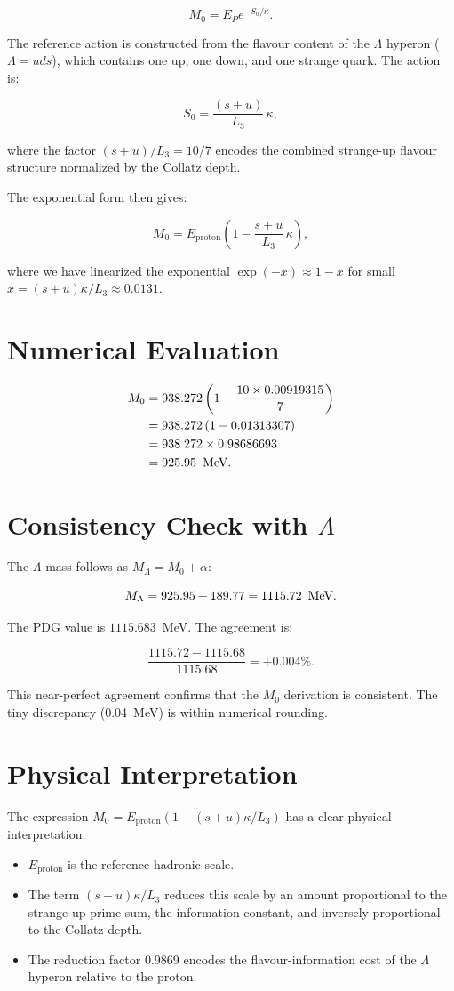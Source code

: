\[
M_0 = E_P e^{-S_0/\kappa}.
\]

The reference action is constructed from the flavour content of the
\(\Lambda\) hyperon (\(\Lambda = uds\)), which contains one up, one down,
and one strange quark.  The action is:

\[
S_0 = \frac{(s+u)}{L_3}\,\kappa,
\]

where the factor \((s+u)/L_3 = 10/7\) encodes the combined strange-up flavour
structure normalized by the Collatz depth.

The exponential form then gives:

\[
M_0 = E_{\text{proton}}\left(1 - \frac{s+u}{L_3}\,\kappa\right),
\]

where we have linearized the exponential \(\exp(-x) \approx 1 - x\) for
small \(x = (s+u)\kappa/L_3 \approx 0.0131\).

\section{Numerical Evaluation}

\[
\begin{aligned}
M_0 &= 938.272\left(1 - \frac{10 \times 0.00919315}{7}\right) \\
    &= 938.272\left(1 - 0.01313307\right) \\
    &= 938.272 \times 0.98686693 \\
    &= 925.95\ \,\text{MeV}.
\end{aligned}
\]

\section{Consistency Check with \(\Lambda\)}

The \(\Lambda\) mass follows as \(M_\Lambda = M_0 + \alpha\):

\[
M_\Lambda = 925.95 + 189.77 = 1115.72\ \mev.
\]

The PDG value is \(1115.683\)~MeV.  The agreement is:

\[
\frac{1115.72 - 1115.68}{1115.68} = +0.004\%.
\]

This near-perfect agreement confirms that the \(M_0\) derivation is
consistent.  The tiny discrepancy (0.04~MeV) is within numerical rounding.

\section{Physical Interpretation}

The expression \(M_0 = E_{\text{proton}}(1 - (s+u)\kappa/L_3)\) has a clear
physical interpretation:

\begin{itemize}
\item \(E_{\text{proton}}\) is the reference hadronic scale.
\item The term \((s+u)\kappa/L_3\) reduces this scale by an amount
proportional to the strange-up prime sum, the information constant, and
inversely proportional to the Collatz depth.
\item The reduction factor 0.9869 encodes the flavour-information cost of
the \(\Lambda\) hyperon relative to the proton.
\end{itemize}

